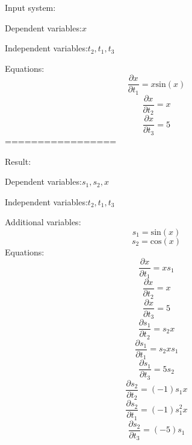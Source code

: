 \documentclass[10pt,a4paper]{article}
\begin{document}
Input system:

Dependent variables:$x$

Independent variables:$t_{2}, t_{1}, t_{3}$

Equations:
\begin{dmath*}\frac{\partial x}{\partial t_{1}} = x  \text{sin}\left(x\right)\end{dmath*}
\begin{dmath*}\frac{\partial x}{\partial t_{2}} = x\end{dmath*}
\begin{dmath*}\frac{\partial x}{\partial t_{3}} = 5\end{dmath*}
=================

Result:

Dependent variables:$s_{1}, s_{2}, x$

Independent variables:$t_{2}, t_{1}, t_{3}$

Additional variables:
\begin{dmath*}s_{1} = \text{sin}\left(x\right)\end{dmath*}
\begin{dmath*}s_{2} = \text{cos}\left(x\right)\end{dmath*}
Equations:
\begin{dmath*}\frac{\partial x}{\partial t_{1}} = x  s_{1}\end{dmath*}
\begin{dmath*}\frac{\partial x}{\partial t_{2}} = x\end{dmath*}
\begin{dmath*}\frac{\partial x}{\partial t_{3}} = 5\end{dmath*}
\begin{dmath*}\frac{\partial s_{1}}{\partial t_{2}} = s_{2}  x\end{dmath*}
\begin{dmath*}\frac{\partial s_{1}}{\partial t_{1}} = s_{2}  x  s_{1}\end{dmath*}
\begin{dmath*}\frac{\partial s_{1}}{\partial t_{3}} = 5  s_{2}\end{dmath*}
\begin{dmath*}\frac{\partial s_{2}}{\partial t_{2}} = \left(-1\right)  s_{1}  x\end{dmath*}
\begin{dmath*}\frac{\partial s_{2}}{\partial t_{1}} = \left(-1\right)  s_{1} ^ {2}  x\end{dmath*}
\begin{dmath*}\frac{\partial s_{2}}{\partial t_{3}} = \left(-5\right)  s_{1}\end{dmath*}
\end{document}

